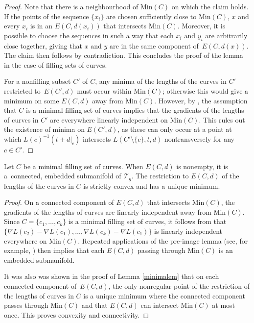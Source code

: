 \begin{proof}
Note that there is a neighbourhood of $\mathrm{Min}(C)$ on which the claim holds. If the points of the sequence $\{x_{i}\}$ are chosen sufficiently close to $\mathrm{Min}(C)$, $x$ and every $x_{i}$ is in an $E(C,d(x_{i}))$ that intersects $\mathrm{Min}(C)$. Moreover, it is possible to choose the sequences in such a way that each $x_{i}$ and $y_{i}$ are arbitrarily close together, giving that $x$ and $y$ are in the same component of~$E(C,d(x))$. The claim then follows by contradiction. This concludes the proof of the lemma in the case of filling sets of curves.

For a nonfilling subset $C'$ of $C$, any minima of the lengths of the curves in $C'$ restricted to~$E(C',d)$ must occur within $\mathrm{Min}(C)$; otherwise this would give a minimum on some $E(C,d)$ away from $\mathrm{Min}(C)$. However, by \cite[Lemma 5]{SchmutzMorse}, the assumption that $C$ is a minimal filling set of curves implies that the gradients of the lengths of curves in $C'$ are everywhere linearly independent on $\mathrm{Min}(C)$. This rules out the existence of minima on $E(C',d)$, as these can only occur at a point at which $L(c)^{-1}(t+d|_{c})$ intersects $L(C'\setminus \{c\},t,d)$ nontransversely for any~${c\in C'}$.
\end{proof}


\begin{Corollary}
\label{linear}
Let $C$ be a minimal filling set of curves. When $E(C,d)$ is nonempty, it is a~connected, embedded submanifold of $\mathcal{T}_{g}$. The restriction to $E(C,d)$ of the lengths of the curves in $C$ is strictly convex and has a unique minimum.
\end{Corollary}

\begin{proof}
On a connected component of $E(C,d)$ that intersects $\mathrm{Min}(C)$, the gradients of the lengths of curves are linearly independent away from $\mathrm{Min}(C)$. Since $C=\{c_{1}, \dots, c_{k}\}$ is a minimal filling set of curves, it follows from \cite[Lemma 5]{SchmutzMorse} that $\bigl\{\nabla L(c_{2})-\nabla L(c_{1}), \dots, \nabla L(c_{k})-\nabla L(c_{1})\bigr\}$ is linearly independent everywhere on $\mathrm{Min}(C)$. Repeated applications of the pre-image lemma (see, for example, \cite[Corollary 5.14]{Lee}) then implies that each $E(C,d)$ passing through $\mathrm{Min}(C)$ is an embedded submanifold.

It was also was shown in the proof of Lemma \ref{minimalem} that on each connected component of~$E(C,d)$, the only nonregular point of the restriction of the lengths of curves in $C$ is a unique minimum where the connected component passes through $\mathrm{Min}(C)$ and that $E(C,d)$ can intersect $\mathrm{Min}(C)$ at most once. This proves convexity and connectivity.
\end{proof}

